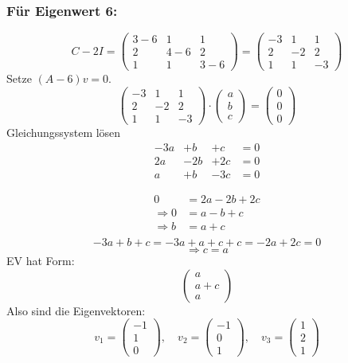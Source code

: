 \documentclass{article} %
\begin{document}
\subsubsection*{Für Eigenwert 6:}
\[
C - 2 I = \begin{pmatrix}
3-6&1&1\\
2&4-6&2\\
1&1&3-6
\end{pmatrix}
 = \begin{pmatrix}
-3&1&1\\
2&-2&2\\
1&1&-3
\end{pmatrix}
\]
Setze $(A - 6)v = 0$.
\[
\begin{pmatrix}
-3&1&1\\
2&-2&2\\
1&1&-3
\end{pmatrix} \cdot \begin{pmatrix}
a \\ b\\c
\end{pmatrix} = \begin{pmatrix}
0\\0\\0
\end{pmatrix}
\]
Gleichungssystem lösen 
\[
\begin{array}{cccc}
 -3a&+b&+c&=0\\
2a&-2b&+2c&=0\\
a&+b&-3c&=0
\end{array}
\]

\begin{align*}
    0 & = 2a-2b+2c\\
    \Rightarrow   0 & = a-b+c\\
    \Rightarrow   b & = a+c\\
\end{align*}
\[
 -3a+b+c  = -3a+a+c+c = -2a+2c = 0
\]
\[
\Rightarrow c = a
\]
EV hat Form:
\[
 \begin{pmatrix}
a\\a+c\\a
\end{pmatrix}
\]
Also sind die Eigenvektoren:
\[
v_1 = \begin{pmatrix}
-1\\1\\0
\end{pmatrix}, \quad v_2 = \begin{pmatrix}
-1\\0\\1
\end{pmatrix}, \quad v_3 =  \begin{pmatrix}
1\\2\\1
\end{pmatrix}
\]
\end{document}
